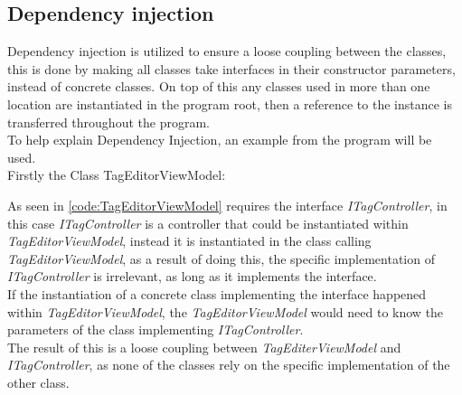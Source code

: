 \subsection{Dependency injection} \label{sc:DependencyInjection}
Dependency injection is utilized to ensure a loose coupling between the classes, this is done by making all classes take interfaces in their constructor parameters, instead of concrete classes. On top of this any classes used in more than one location are instantiated in the program root, then a reference to the instance is transferred throughout the program. \\
To help explain Dependency Injection, an example from the program will be used.\\
Firstly the Class TagEditorViewModel:

\vspace{\baselineskip}

As seen in \autoref{code:TagEditorViewModel} requires the interface \textit{ITagController}, in this case \textit{ITagController} is a controller that could be instantiated within \textit{TagEditorViewModel}, instead it is instantiated in the class calling \textit{TagEditorViewModel}, as a result of doing this, the specific implementation of \textit{ITagController} is irrelevant, as long as it implements the interface. \\
If the instantiation of a concrete class implementing the interface happened within \textit{TagEditorViewModel}, the \textit{TagEditorViewModel} would need to know the parameters of the class implementing \textit{ITagController}. \\
The result of this is a loose coupling between \textit{TagEditerViewModel} and \textit{ITagController}, as none of the classes rely on the specific implementation of the other class. \par

